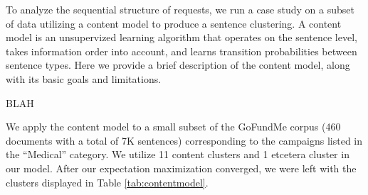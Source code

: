 \documentclass[letterpaper]{article}
\begin{document}
To analyze the sequential structure of requests, we run a case study on a subset of data utilizing a content model \cite{barzilay2004catching} to produce a sentence clustering. A content model is an unsupervized learning algorithm that operates on the sentence level, takes information order into account, and learns transition probabilities between sentence types. Here we provide a brief description of the content model, along with its basic goals and limitations.

BLAH

We apply the content model to a small subset of the GoFundMe corpus (460 documents with a total of 7K sentences) corresponding to the campaigns listed in the ``Medical'' category. We utilize 11 content clusters and 1 etcetera cluster in our model. After our expectation maximization converged, we were left with the clusters displayed in Table \ref{tab:contentmodel}.
\end{document}
